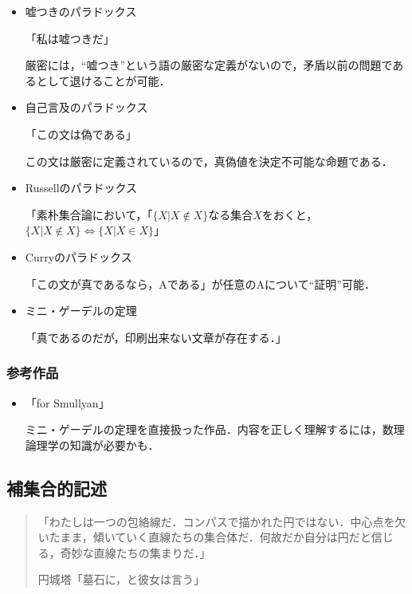 \documentclass[10pt, a5paper, twoside]{jsarticle}
\begin{document}
				\begin{itemize}

					\item 嘘つきのパラドックス

						「私は嘘つきだ」

						厳密には，“嘘つき”という語の厳密な定義がないので，矛盾以前の問題であるとして退けることが可能．

					\item 自己言及のパラドックス

						「この文は偽である」

						この文は厳密に定義されているので，真偽値を決定不可能な命題である．

					\item Russellのパラドックス

						「素朴集合論において，「$ \{ X | X \notin X \} $なる集合$X$をおくと，$ \{ X | X \notin X \} \Leftrightarrow \{ X | X \in X \}$」

					\item Curryのパラドックス

						「この文が真であるなら，Aである」が任意のAについて“証明”可能．

					\item ミニ・ゲーデルの定理

						「真であるのだが，印刷出来ない文章が存在する．」

				\end{itemize}

			\subsubsection*{参考作品}

				\begin{itemize}
		
					\item 「for Smullyan」
					
						ミニ・ゲーデルの定理を直接扱った作品．内容を正しく理解するには，数理論理学の知識が必要かも．

				\end{itemize}

		\subsection{補集合的記述}

			\begin{quote}

				「わたしは一つの包絡線だ．コンパスで描かれた円ではない．中心点を欠いたまま，傾いていく直線たちの集合体だ．何故だか自分は円だと信じる，奇妙な直線たちの集まりだ．」

				\hspace{\fill}円城塔「墓石に，と彼女は言う」

			\end{quote}
			
\end{document}
